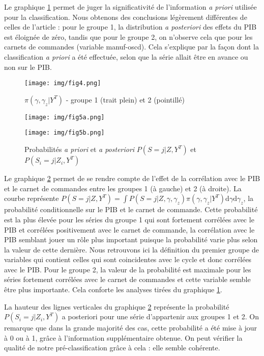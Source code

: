 \documentclass[10pt,french,french]{article}
\begin{document}
Le graphique \ref{pi-gamma} permet de juger la significativité de l'information \emph{a priori} utilisée pour la classification.
Nous obtenons des conclusions légèrement différentes de celles de l'article : pour le groupe 1, la distribution \emph{a posteriori} des effets du PIB est éloignée de zéro, tandis que pour le groupe 2, on n'observe cela que pour les carnets de commandes (variable manuf-oscd).
Cela s'explique par la façon dont la classification \emph{a priori} a été effectuée, selon que la série allait être en avance ou non sur le PIB.

\begin{figure}
\centering
\texttt{[image: img/fig4.png]}
\caption{$\pi(\gamma,\gamma_z|Y^T)$ - groupe 1 (trait plein) et 2 (pointillé)}
\label{pi-gamma}
\end{figure}

\begin{figure}
\begin{minipage}{.5\textwidth}
\texttt{[image: img/fig5a.png]}
\end{minipage}
\hfill
\begin{minipage}{.5\textwidth}
\texttt{[image: img/fig5b.png]}
\end{minipage}
\caption{Probabilités \textit{a priori} et \textit{a posteriori} $P(S = j|Z,Y^T)$ et $P(S_i = j|Z_i,Y^T)$}
\label{graph3d}
\end{figure}

Le graphique \ref{graph3d} permet de se rendre compte de l'effet de la corrélation avec le PIB et le carnet de commandes entre les groupes 1 (à gauche) et 2 (à droite).
La courbe représente \(P(S = j|Z,Y^T) = \int P(S=j|Z,\gamma,\gamma_z)\pi(\gamma,\gamma_z|Y^T)\mathrm{d}\gamma\mathrm{d}\gamma_z\), la probabilité conditionnelle sur le PIB et le carnet de commande.
Cette probabilité est la plus élevée pour les séries du groupe 1 qui sont fortement corrélées avec le PIB et corrélées positivement avec le carnet de commande, la corrélation avec le PIB semblant jouer un rôle plus important puisque la probabilité varie plus selon la valeur de cette dernière.
Nous retrouvons ici la définition du premier groupe de variables qui contient celles qui sont coincidentes avec le cycle et donc corrélées avec le PIB.
Pour le groupe 2, la valeur de la probabilité est maximale pour les séries fortement corrélées avec le carnet de commandes et cette variable semble être plus importante.
Cela conforte les analyses tirées du graphique \ref{pi-gamma}.

La hauteur des lignes verticales du graphique \ref{graph3d} représente la probabilité \(P(S_i = j|Z_i,Y^T)\) a posteriori pour une série d'appartenir aux groupes 1 et 2.
On remarque que dans la grande majorité des cas, cette probabilité a été mise à jour à 0 ou à 1, grâce à l'information supplémentaire obtenue.
On peut vérifier la qualité de notre pré-classification grâce à cela : elle semble cohérente.
\end{document}
